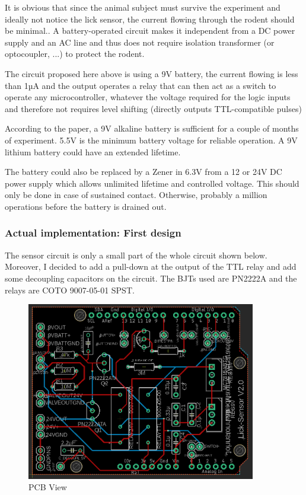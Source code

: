 \documentclass[a4paper]{article}
\begin{document}
It is obvious that since the animal subject must survive the experiment and ideally not notice the lick sensor, the current flowing through the rodent should be minimal..
A battery-operated circuit makes it independent from a DC power supply and an AC line and thus does not require isolation transformer (or optocoupler, ...) to protect the rodent.

The circuit proposed here above is using a 9V battery, the current flowing is less than 1µA and the output operates a relay that can then act as a switch to operate any microcontroller, whatever the voltage required for the logic inputs and therefore not requires level shifting (directly outputs TTL-compatible pulses)

According to the paper, a 9V alkaline battery is sufficient for a couple of months of experiment. 5.5V is the minimum battery voltage for reliable operation. A 9V lithium battery could have an extended lifetime.

The battery could also be replaced by a Zener in 6.3V from a 12 or 24V DC power supply which allows unlimited lifetime and controlled voltage. This should only be done in case of sustained contact. Otherwise, probably a million operations before the battery is drained out.

\subsubsection{Actual implementation: First design}
The sensor circuit is only a small part of the whole circuit shown below. Moreover, I decided to add a pull-down at the output of the TTL relay and add some decoupling capacitors on the circuit.
The BJTs used are PN2222A and the relays are COTO 9007-05-01 SPST.

\begin{figure}[h!b!t!]
    \centering
    \includegraphics[width = 10cm]{images/schematic.PNG}
    \caption{PCB View}
    \label{fig:schematic}
\end{figure}
\end{document}

